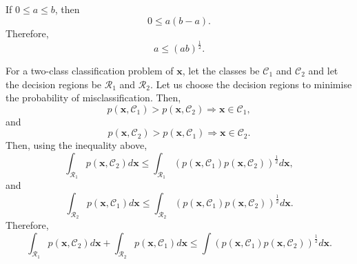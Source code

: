 \subsection{}
\label{1.21}
If $0 \leq a \leq b$, then
%
\begin{equation}
0 \leq a (b - a).
\end{equation}
%
Therefore,
%
\begin{equation}
a \leq (ab) ^ \frac{1}{2}.
\end{equation}
%

For a two-class classification problem of $\mathbf{x}$, let the classes be $\mathcal{C}_1$ and $\mathcal{C}_2$ and let the decision regions be $\mathcal{R}_1$ and $\mathcal{R}_2$.
Let us choose the decision regions to minimise the probability of misclassification.
Then,
%
\begin{equation}
p(\mathbf{x}, \mathcal{C}_1) > p(\mathbf{x}, \mathcal{C}_2) \Rightarrow \mathbf{x} \in \mathcal{C}_1, 
\end{equation}
%
and
%
\begin{equation}
p(\mathbf{x}, \mathcal{C}_2) > p(\mathbf{x}, \mathcal{C}_1) \Rightarrow \mathbf{x} \in \mathcal{C}_2.
\end{equation}
%
Then, using the inequality above,
%
\begin{equation}
\int_{\mathcal{R}_1} p(\mathbf{x}, \mathcal{C}_2) d\mathbf{x} \leq \int_{\mathcal{R}_1} \left( p(\mathbf{x}, \mathcal{C}_1) p(\mathbf{x}, \mathcal{C}_2) \right) ^ \frac{1}{2} d\mathbf{x},
\end{equation}
%
and
%
\begin{equation}
\int_{\mathcal{R}_2} p(\mathbf{x}, \mathcal{C}_1) d\mathbf{x} \leq \int_{\mathcal{R}_2} \left( p(\mathbf{x}, \mathcal{C}_1) p(\mathbf{x}, \mathcal{C}_2) \right) ^ \frac{1}{2} d\mathbf{x}.
\end{equation}
%
Therefore,
%
\begin{equation}
\int_{\mathcal{R}_1} p(\mathbf{x}, \mathcal{C}_2) d\mathbf{x} + \int_{\mathcal{R}_2} p(\mathbf{x}, \mathcal{C}_1) d\mathbf{x} \leq \int \left( p(\mathbf{x}, \mathcal{C}_1) p(\mathbf{x}, \mathcal{C}_2) \right) ^ \frac{1}{2} d\mathbf{x}.
\end{equation}
%



